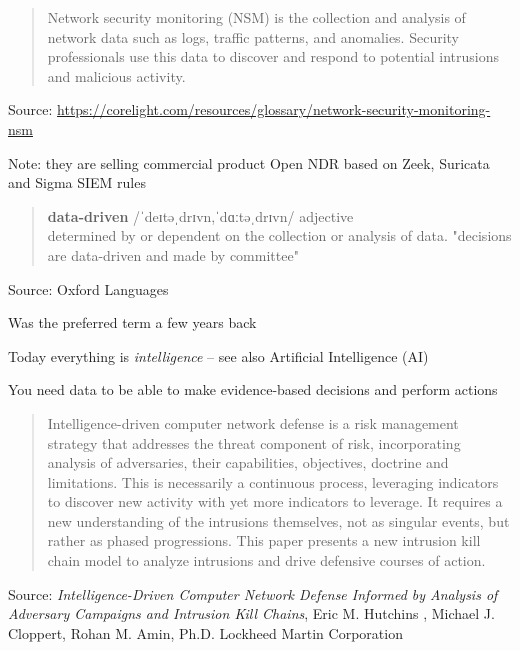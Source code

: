 \documentclass[Screen16to9,17pt]{foils}
\begin{document}


\begin{quote}
Network security monitoring (NSM) is the collection and analysis of network data such as logs, traffic patterns, and anomalies. Security professionals use this data to discover and respond to potential intrusions and malicious activity.

\end{quote}
Source: \url{https://corelight.com/resources/glossary/network-security-monitoring-nsm}

\begin{list2}
\item Note: they are selling commercial product Open NDR based on Zeek, Suricata and Sigma SIEM rules
\end{list2}



\begin{quote}
{\large\bf  data-driven} /ˈdeɪtəˌdrɪvn,ˈdɑːtəˌdrɪvn/
adjective\\
determined by or dependent on the collection or analysis of data.
"decisions are data-driven and made by committee"
\end{quote}
Source:  Oxford Languages

\begin{list2}
\item Was the preferred term a few years back
\item Today everything is \emph{intelligence} -- see also Artificial Intelligence (AI)
\item You need data to be able to make evidence-based decisions and perform actions
\end{list2}


\begin{quote}
Intelligence-driven computer network defense is a risk management strategy that addresses the threat
component of risk, incorporating analysis of adversaries, their capabilities, objectives, doctrine and limitations. This is necessarily a continuous process, leveraging indicators to discover new activity with yet more indicators to leverage. It requires a new understanding of the intrusions themselves, not as singular events, but rather as phased progressions. This paper presents a new intrusion kill chain model to analyze intrusions and drive defensive courses of action.

\end{quote}
Source: \emph{Intelligence-Driven Computer Network Defense Informed by Analysis of Adversary Campaigns and Intrusion Kill Chains}, Eric M. Hutchins , Michael J. Cloppert, Rohan M. Amin, Ph.D. Lockheed Martin Corporation\\{\footnotesize
 }
\end{document}
